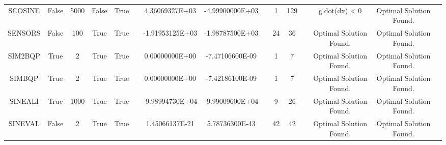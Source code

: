 \begin{longtable}{ccccccccccccccc}
	\cellcolor{default2} SCOSINE& \cellcolor{default2} False& \cellcolor{default2} 5000& \cellcolor{default2} False& \cellcolor{default2} True& \cellcolor{header} & \cellcolor{poor} 4.36069327E+03& \cellcolor{best} -4.99900000E+03& \cellcolor{header} & \cellcolor{best} 1& \cellcolor{poor} 129& \cellcolor{header} & \cellcolor{default2} g.dot(dx) < 0& \cellcolor{default2} Optimal Solution Found.& \cellcolor{header} \\
	\cellcolor{default1} SENSORS& \cellcolor{default1} False& \cellcolor{default1} 100& \cellcolor{default1} True& \cellcolor{default1} True& \cellcolor{header} & \cellcolor{poor} -1.91953125E+03& \cellcolor{best} -1.98787500E+03& \cellcolor{header} & \cellcolor{best} 24& \cellcolor{ok} 36& \cellcolor{header} & \cellcolor{default1} Optimal Solution Found.& \cellcolor{default1} Optimal Solution Found.& \cellcolor{header} \\
	\cellcolor{default2} SIM2BQP& \cellcolor{default2} True& \cellcolor{default2} 2& \cellcolor{default2} True& \cellcolor{default2} True& \cellcolor{header} & \cellcolor{ok} 0.00000000E+00& \cellcolor{best} -7.47106600E-09& \cellcolor{header} & \cellcolor{best} 1& \cellcolor{poor} 7& \cellcolor{header} & \cellcolor{default2} Optimal Solution Found.& \cellcolor{default2} Optimal Solution Found.& \cellcolor{header} \\
	\cellcolor{default1} SIMBQP& \cellcolor{default1} True& \cellcolor{default1} 2& \cellcolor{default1} True& \cellcolor{default1} True& \cellcolor{header} & \cellcolor{ok} 0.00000000E+00& \cellcolor{best} -7.42186100E-09& \cellcolor{header} & \cellcolor{best} 1& \cellcolor{poor} 7& \cellcolor{header} & \cellcolor{default1} Optimal Solution Found.& \cellcolor{default1} Optimal Solution Found.& \cellcolor{header} \\
	\cellcolor{default2} SINEALI& \cellcolor{default2} True& \cellcolor{default2} 1000& \cellcolor{default2} True& \cellcolor{default2} True& \cellcolor{header} & \cellcolor{ok} -9.98994730E+04& \cellcolor{best} -9.99009600E+04& \cellcolor{header} & \cellcolor{best} 9& \cellcolor{poor} 26& \cellcolor{header} & \cellcolor{default2} Optimal Solution Found.& \cellcolor{default2} Optimal Solution Found.& \cellcolor{header} \\
	\cellcolor{default1} SINEVAL& \cellcolor{default1} False& \cellcolor{default1} 2& \cellcolor{default1} True& \cellcolor{default1} True& \cellcolor{header} & \cellcolor{ok} 1.45066137E-21& \cellcolor{best} 5.78736300E-43& \cellcolor{header} & \cellcolor{best} 42& \cellcolor{best} 42& \cellcolor{header} & \cellcolor{default1} Optimal Solution Found.& \cellcolor{default1} Optimal Solution Found.& \cellcolor{header} \\

\end{longtable}
